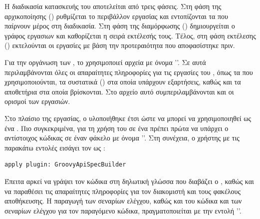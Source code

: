 Η διαδικασία κατασκευής του  αποτελείται από τρεις φάσεις.
Στη φάση της αρχικοποίησης () ρυθμίζεται το περιβάλλον εργασίας 
και εντοπίζονται τα  που παίρνουν μέρος στη διαδικασία.
Στη φάση της διαμόρφωσης () δημιουργείται ο γράφος εργασιων 
και καθορίζεται η σειρά εκτέλεσής τους.
Τέλος, στη φάση εκτέλεσης () εκτελούνται οι εργασίες με βάση την προτεραιότητα που αποφασίστηκε πριν.

Για την οργάνωση των ,
το  χρησιμοποιεί αρχεία με όνομα ''.
Σε αυτά περιλαμβάνονται όλες οι απαραίτητες πληροφορίες για τις εργασίες του ,
όπως τα  που χρησιμοποιούνται,
τα συστατικά () στα οποία υπάρχουν εξαρτήσεις, καθώς και τα αποθετήρια στα οποία βρίσκονται.
Στο αρχείο αυτό συμπεριλαμβάνονται και οι ορισμοί των εργασιών. 

Στο πλαίσιο της εργασίας,
ο  υλοποιήθηκε έτσι ώστε να μπορεί να χρησιμοποιηθεί ως ένα .
Πιο συγκεκριμένα, 
για τη χρήση του σε ένα  πρέπει πρώτα να υπάρχει ο αντίστοιχος κώδικας σε έναν φάκελο με όνομα ''.
Στη συνέχεια, 
ο χρήστης με τις παρακάτω εντολές εισάγει τον  ως :

\begin{lstlisting}[morekeywords={apply,plugin}]
apply plugin: GroovyApiSpecBuilder
\end{lstlisting}

Έπειτα αρκεί να γράψει τον κώδικα στη δηλωτική γλώσσα  που διαβάζει ο ,
καθώς και να παραθέσει τις απαραίτητες πληροφορίες για τον διακομιστή και τους φακέλους αποθήκευσης.
Η παραγωγή των σεναρίων ελέγχου,
καθώς και του κώδικα  και των σεναρίων ελέγχου για τον παραγόμενο κώδικα,
πραγματοποιείται με την εντολή ''.
